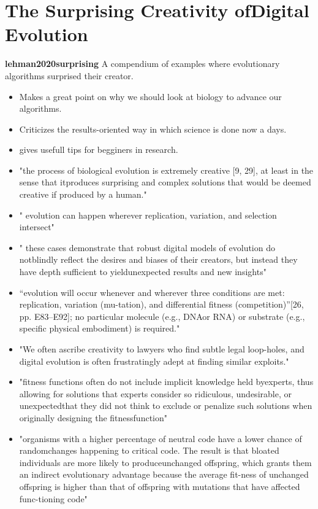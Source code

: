 \documentclass{article}
\begin{document}
\section{The Surprising Creativity ofDigital Evolution}
\textbf{lehman2020surprising} \cite{lehman2020surprising}\newline
A compendium of examples where evolutionary algorithms surprised their creator.
\begin{itemize}
    \item Makes a great point on why we should look at biology to advance our algorithms.
    \item Criticizes the results-oriented way in which science is done now a days.
    \item gives usefull tips for begginers in research.
    \item "the process of biological evolution is extremely creative [9, 29], at least in the sense that itproduces surprising and complex solutions that would be deemed creative if produced by a human."
    \item " evolution can happen wherever replication, variation, and selection intersect"
    \item "  these cases demonstrate that robust digital models of evolution do notblindly reflect the desires and biases of their creators, but instead they have depth sufficient to yieldunexpected results and new insights"
    \item “evolution will occur whenever and wherever three conditions are met: replication, variation (mu-tation), and differential fitness (competition)”[26, pp. E83–E92]; no particular molecule (e.g., DNAor RNA) or substrate (e.g., specific physical embodiment) is required."
    \item "We often ascribe creativity to lawyers who find subtle legal loop-holes, and digital evolution is often frustratingly adept at finding similar exploits."
    \item "fitness functions often do not include implicit knowledge held byexperts, thus allowing for solutions that experts consider so ridiculous, undesirable, or unexpectedthat they did not think to exclude or penalize such solutions when originally designing the fitnessfunction"
    \item "organisms with a higher percentage of neutral code have a lower chance of randomchanges happening to critical code. The result is that bloated individuals are more likely to produceunchanged offspring, which grants them an indirect evolutionary advantage because the average fit-ness of unchanged offspring is higher than that of offspring with mutations that have affected func-tioning code"
    
\end{itemize}
\end{document}
